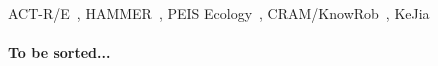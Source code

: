 \documentclass[11pt,a4paper]{report}
\begin{document}
%
%
%
%
%
ACT-R/E~\cite{trafton2013act}, HAMMER~\cite{demiris2006hierarchical}, PEIS
Ecology~\cite{saffiotti2005peis,daoutis2012cooperative},
CRAM/KnowRob~\cite{beetz2010cram, tenorth2009knowrob},
KeJia~\cite{chen2010developing}


\paragraph{To be sorted...}
\end{document}
